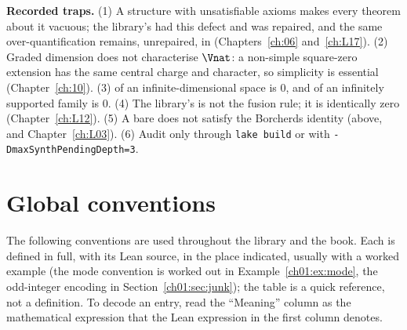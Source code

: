\begin{warning}
\textbf{Recorded traps.} (1) A structure with unsatisfiable axioms makes every theorem about it
vacuous; the library's  had this defect and was repaired, and the same
over-quantification remains, unrepaired, in 
(Chapters~\ref{ch:06} and~\ref{ch:L17}). (2) Graded dimension does not characterise $\Vnat$: a
non-simple square-zero extension has the same central charge and character, so simplicity is
essential (Chapter~\ref{ch:10}). (3)  of an infinite-dimensional space is $0$,
and  of an infinitely supported family is $0$. (4) The library's  is not
the fusion rule; it is identically zero (Chapter~\ref{ch:L12}). (5) A bare  does
not satisfy the Borcherds identity (above, and Chapter~\ref{ch:L03}). (6) Audit only through
\texttt{lake build} or with \texttt{-DmaxSynthPendingDepth=3}.
\end{warning}

\section{Global conventions}\label{ch01:sec:conventions}

The following conventions are used throughout the library and the book. Each is defined in full,
with its Lean source, in the place indicated, usually with a worked example (the mode convention is
worked out in Example~\ref{ch01:ex:mode}, the odd-integer encoding in Section~\ref{ch01:sec:junk});
the table is a quick reference, not a definition. To decode an entry, read the ``Meaning'' column
as the mathematical expression that the Lean expression in the first column denotes.

